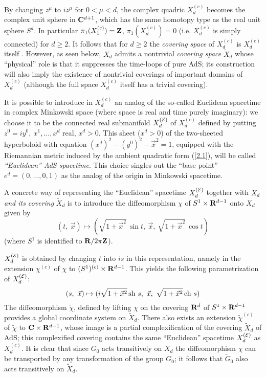 \documentclass[a4paper,a4paper]{article}
\def\bC{{\bf C}}
\def\bR{{\bf R}}
\def\bZ{{\bf Z}}
\def\wt{\widetilde}
\def\wchi{{\wt \chi}}
\begin{document}
By changing $z^\mu$
to $iz^\mu$ for $0< \mu < d$,
the complex quadric $X_d^{(c)}$ becomes
the complex unit sphere in $\bC^{d+1}$, which has the
same homotopy type as the real unit sphere $S^d$.
In particular
$\pi_1(X_1^{(c)}) = \bZ$, $\pi_1(X_d^{(c)}) = 0$ (i.e.
$X_d^{(c)}$ is simply connected) for $d \ge 2$.
It follows that for $d \ge2$ the {\sl covering space} of $X_d^{(c)}$
is $ X_d^{(c)}$ itself .
However, as seen below, $X_d$ admits a nontrivial
{\sl covering space}
$\wt X_d$ whose ``physical'' role
is that it suppresses the time-loops
of pure AdS; its construction will also imply the existence of
nontrivial coverings of important domains of
$ X_d^{(c)}$ (although the full space
$ X_d^{(c)}$ itself has a trivial covering).

\vskip 0.2cm
It is possible to introduce in $X_d^{(c)}$ an analog of
the so-called Euclidean spacetime in complex Minkowski
space (where space is real and time purely imaginary):
we choose it to be the connected real submanifold
$X_d^{(\cal E)}$
of $X_d^{(c)}$
defined by putting
$z^0 = i y^0,\  x^1,\ldots,x^d$ real, $x^d >0$.
This sheet ($x^d >0$) of the two-sheeted hyperboloid
with equation $(x^d)^2 -(y^0)^2 - {\vec{x}}^2 = 1$,
equipped with the Riemannian metric induced by the
ambient quadratic form (\ref{2.1}), will be called
{\sl ``Euclidean'' AdS spacetime}. This choice
singles out the ``base point'' $e^d = (0,\ldots,0,1)$
as the analog of the origin in Minkowski spacetime.

\vskip 0.2cm
A concrete way of representing
the ``Euclidean'' spacetime
$X_d^{(\cal E)}$ together with $X_d$
{\sl and its covering} $\wt X_d$ is to introduce
the diffeomorphism $\chi$ of $S^1\times \bR^{d-1}$ onto $X_d$ given by
\begin{equation}
(t,\ \vec{x}) \mapsto
(\sqrt{1+\vec{x}^2}\,\sin t,\ \vec{x},\ \sqrt{1+\vec{x}^2}\,\cos t)
\label{2.11}\end{equation}
(where $S^1$ is identified to $\bR/2\pi \bZ$).

$X_d^{(\cal E)}$ is obtained by changing $t$ into $ is$ in this
representation, namely in the extension $\chi^{(c)}$ of $\chi$ to
$(S^1)^{(c)}\times \bR^{d-1}$. This yields the following
parametrization of
$X_d^{(\cal E)}$:
\begin{equation}
(s,\ \vec{x}) \mapsto
(i\sqrt{1+\vec{x}^2}\,{\rm sh}\  s,\ \vec{x},\ \sqrt{1+\vec{x}^2}\,{\rm
ch}\ s)
\label{parameucl}\end{equation}
The diffeomorphism $\wchi$, defined by lifting
$\chi$ on the covering $\bR^{d}$ of
$S^1\times \bR^{d-1}$
provides a global coordinate system on $\wt X_d$.
There also exists an
extension
$\wchi^{(c)}$ of $\wchi$ to ${\bf C}\times \bR^{d-1}$, whose image is
a partial complexification of the covering
$\wt X_d$ of AdS; this complexified covering contains
the same ``Euclidean'' spacetime
$X_d^{(\cal E)}$ as $X_d^{(c)}$.
It is clear that since $G_0$ acts transitively on $X_d$
the diffeomorphism $\chi$ can be transported by
any transformation of the group $G_0$; it follows that
$\wt G_0$ also acts transitively on
$\wt X_d$.
\end{document}
